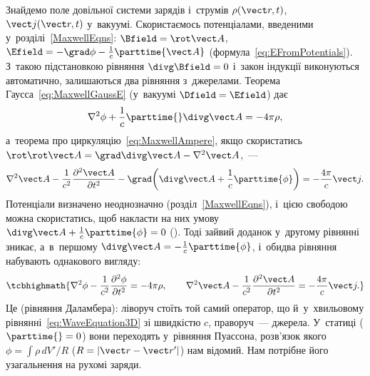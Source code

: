 Знайдемо поле довільної системи зарядів і~струмів $\rho(\vect r,t)$, $\vect j(\vect r,t)$ у~вакуумі.
Скористаємось потенціалами, введеними у~розділі~\ref{MaxwellEqns}:
$\Bfield=\rot\vect A$, $\Efield=-\grad\phi-\frac1c\parttime{\vect A}$ (формула~\eqref{eq:EFromPotentials}).
З~такою підстановкою рівняння $\divg\Bfield=0$ і~закон індукції виконуються автоматично, залишаються
два рівняння з~джерелами. Теорема Гаусса~\eqref{eq:MaxwellGaussE} (у~вакуумі $\Dfield=\Efield$) дає
\begin{equation*}
	\nabla^2\phi+\frac1c\parttime{}\divg\vect A=-4\pi\rho,
\end{equation*}
а~теорема про циркуляцію~\eqref{eq:MaxwellAmpere}, якщо скористатись $\rot\rot\vect A=\grad\divg\vect A-\nabla^2\vect A$,~---
\begin{equation*}
	\nabla^2\vect A-\frac1{c^2}\frac{\partial^2\vect A}{\partial t^2}-\grad\!\left(\divg\vect A+\frac1c\parttime{\phi}\right)=-\frac{4\pi}{c}\vect j.
\end{equation*}
Потенціали визначено неоднозначно (розділ~\ref{MaxwellEqns}), і~цією свободою можна скористатись, щоб
накласти на них умову $\divg\vect A+\frac1c\parttime{\phi}=0$ ().
Тоді зайвий доданок у~другому рівнянні зникає, а~в~першому $\divg\vect A=-\frac1c\parttime{\phi}$, і~обидва рівняння
набувають однакового вигляду:
\begin{equation}\label{eq:Dalambert}
	\tcbhighmath{
	\nabla^2\phi-\frac1{c^2}\frac{\partial^2\phi}{\partial t^2}=-4\pi\rho,\qquad
	\nabla^2\vect A-\frac1{c^2}\frac{\partial^2\vect A}{\partial t^2}=-\frac{4\pi}{c}\vect j.
	}
\end{equation}
Це  (рівняння Даламбера): ліворуч стоїть той самий оператор, що й~у~хвильовому
рівнянні~\eqref{eq:WaveEquation3D} зі швидкістю $c$, праворуч~--- джерела. У~статиці ($\parttime{}=0$) вони переходять
у~рівняння Пуассона, розв'язок якого $\phi=\int\rho\,dV'/R$ ($R=|\vect r-\vect r'|$) нам відомий. Нам потрібне його
узагальнення на рухомі заряди.

